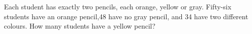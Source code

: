 Each student has exactly two pencils, each orange, yellow or gray. Fifty-six students have an orange pencil,48 have no gray pencil, and 34 have two different colours. How many students have a yellow pencil?
